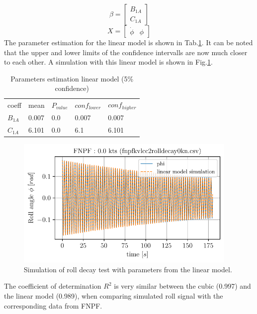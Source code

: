 \begin{equation}
\beta = \left[\begin{matrix}B_{1A}\\C_{1A}\end{matrix}\right]
\label{eq:eq_beta2}
\end{equation}
\begin{equation}
X = \left[\begin{matrix}\dot{\phi} & \phi\end{matrix}\right]
\label{eq:eq_X2}
\end{equation}
The parameter estimation for the linear model is shown in
Tab.\ref{tab:parameters2}. It can be noted that the upper and
lower limits of the confidence intervalls are now much closer to each
other. A simulation with this linear model is shown in
Fig.\ref{fig:sim_linear}.
\begin{table}[H]
\scriptsize
\center
\caption{Parameters estimation linear model (5\% confidence)}
\label{tab:parameters2}
\begin{tabular}{|l|l|l|l|l|}
\hline\addlinespace
coeff & mean & $P_{value}$ & $conf_{lower}$ & $conf_{higher}$\\
$B_{1A}$ & 0.007 & 0.0 & 0.007 & 0.007\\
\hline$C_{1A}$ & 6.101 & 0.0 & 6.1 & 6.101\\
\hline
\end{tabular}
\end{table}
\begin{figure}[H]
\begin{center}\includegraphics[width = 0.95\textwidth]{figures/sim_linear.pdf}\end{center}
\vspace{-0.7cm}
\caption{Simulation of roll decay test with parameters from the linear model.}
\label{fig:sim_linear}
\end{figure}
The coefficient of determination $R^2$ is very similar between the
cubic (0.997) and the linear model (0.989), when comparing simulated
roll signal with the corresponding data from FNPF.
